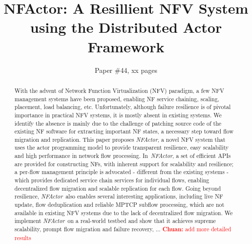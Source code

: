 \documentclass{sig-alternate-10pt}
\def\nfactor{\textit{NFActor}}
\newcommand{\chuan}[1]{\textcolor{red}{{\bf Chuan:} #1}}
\begin{document}
\title{\Large \bf NFActor: A Resillient NFV System using the Distributed Actor Framework}


\author{
Paper \#44, xx pages
}

\maketitle

\begin{abstract}

With the advent of Network Function Virtualization (NFV) paradigm, a few NFV management systems have been proposed, enabling  NF service chaining, scaling, placement, load balancing, etc. Unfortunately, although failure resilience is of pivotal importance in practical NFV systems, it is mostly absent in existing systems.
We identify the absence is mainly due to the challenge of patching source code of the existing NF software for extracting important NF states, a necessary step toward flow migration and replication. %
 This paper proposes \nfactor, a novel NFV system that uses the actor programming model to provide transparent resilience, easy scalability and high performance in network flow processing. %
 In~\nfactor, a set of efficient APIs are provided for constructing NFs, with inherent support for scalability and resilience; a per-flow management principle is advocated - different from the existing systems - which provides dedicated service chain services for individual flows, enabling decentralized flow migration and scalable replication for each flow. %
Going beyond resilience, \nfactor~also enables several interesting applications, including live NF update, flow deduplication and reliable MPTCP subflow processing, which are not available in existing NFV systems due to the lack of decentralized flow migration. We implement \nfactor~on a real-world testbed and show that it achieves supreme scalability, prompt flow migration and failure recovery, ... \chuan{add more detailed results}



\end{abstract}
\end{document}
